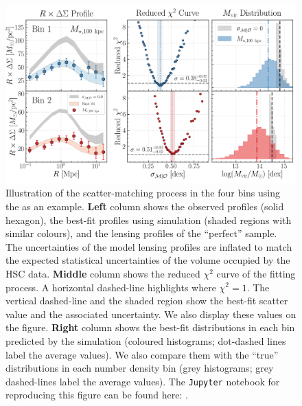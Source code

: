 \documentclass[fleqn,usenatbib,useAMS]{mnras}
\begin{document}
  \begin{figure}
      \centering
      \includegraphics[width=\textwidth]{figure/fig_A1}
      \caption{
          Illustration of the scatter-matching process in the four \topn{} bins using the
           as an example.
          \textbf{Left} column shows the observed \rdsigma{} profiles (solid hexagon), the best-fit
          profiles using  simulation (shaded regions with similar colours), and the
          lensing profiles of the ``perfect'' \topn{} sample.
          The uncertainties of the model lensing profiles are inflated to match the expected
          statistical uncertainties of the volume occupied by the HSC data.
          \textbf{Middle} column shows the reduced $\chi^{2}$ curve of the fitting process.
          A horizontal dashed-line highlights where $\chi^{2}=1$.
          The vertical dashed-line and the shaded region show the best-fit scatter value and the
          associated uncertainty. We also display these values on the figure.
          \textbf{Right} column shows the best-fit \mvir{} distributions in each bin predicted
          by the  simulation (coloured histograms; dot-dashed lines label the average
          \mvir{} values).
          We also compare them with the ``true'' \mvir{} distributions in each number density bin
          (grey histograms; grey dashed-lines label the average \mvir{} values).
          The \texttt{Jupyter} notebook for reproducing this figure can be found here:
          \href{https://github.com/dr-guangtou/jianbing/blob/master/notebooks/figure/figA1.ipynb}{\faGithub}.
      }
      \label{fig:fitting}
  \end{figure}
\end{document}

